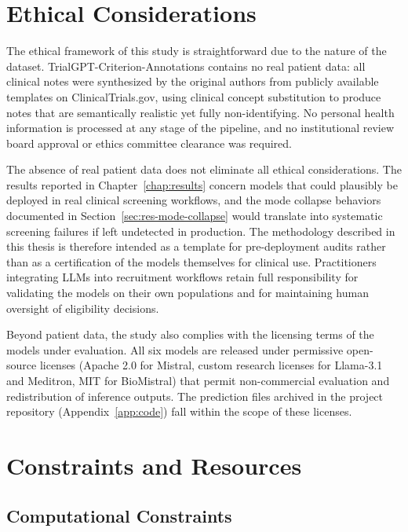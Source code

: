 \section{Ethical Considerations}
\label{sec:ctx-ethics}

The ethical framework of this study is straightforward due to the 
nature of the dataset. TrialGPT-Criterion-Annotations contains no 
real patient data: all clinical notes were synthesized by the 
original authors from publicly available templates on 
ClinicalTrials.gov, using clinical concept substitution to produce 
notes that are semantically realistic yet fully non-identifying. No 
personal health information is processed at any stage of the 
pipeline, and no institutional review board approval or ethics 
committee clearance was required.

The absence of real patient data does not eliminate all ethical 
considerations. The results reported in Chapter~\ref{chap:results} 
concern models that could plausibly be deployed in real clinical 
screening workflows, and the mode collapse behaviors documented in 
Section~\ref{sec:res-mode-collapse} would translate into systematic 
screening failures if left undetected in production. The methodology 
described in this thesis is therefore intended as a template for 
pre-deployment audits rather than as a certification of the models 
themselves for clinical use. Practitioners integrating LLMs into 
recruitment workflows retain full responsibility for validating the 
models on their own populations and for maintaining human oversight 
of eligibility decisions.

Beyond patient data, the study also complies with the licensing terms 
of the models under evaluation. All six models are released under 
permissive open-source licenses (Apache 2.0 for Mistral, custom 
research licenses for Llama-3.1 and Meditron, MIT for BioMistral) 
that permit non-commercial evaluation and redistribution of 
inference outputs. The prediction files archived in the project 
repository (Appendix~\ref{app:code}) fall within the scope of these 
licenses.

\section{Constraints and Resources}
\label{sec:ctx-constraints}

\subsection{Computational Constraints}
\label{subsec:ctx-compute}

